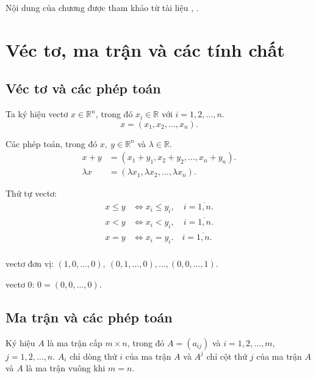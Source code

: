 \documentclass[12pt,a4paper]{report}
\begin{document}
Nội dung của chương được tham khảo từ tài liệu \cite{phanhoangchon}, \cite{lay2003linear}.

\section{ Véc tơ, ma trận và các tính chất}

\subsection{ Véc tơ và các phép toán }

Ta ký hiệu vectơ $x \in \mathbb{R}^n$, trong đó $x_i \in \mathbb{R}$ với $i=1,2,\ldots,n$.
\begin{equation*}
x=(x_1,x_2,\ldots,x_n).
\end{equation*}
 
Các phép toán, trong đó $x, \: y \in \mathbb{R}^n$ và $\lambda \in \mathbb{R}$.
\begin{equation*}
\begin{split}
x + y &= (x_1 + y_1, x_2 + y_2 , \ldots , x_n +y_n). \\
\lambda x &= (\lambda x_1 , \lambda x_2 , \ldots , \lambda x_n).
\end{split}
\end{equation*}

Thứ tự vectơ:
\begin{equation*}
\begin{split}
x \leq y & \Leftrightarrow x_i \leq y_i, \quad i= \overline{1,n}. \\
x < y & \Leftrightarrow x_i < y_i,  \quad i= \overline{1,n}.\\
x = y & \Leftrightarrow x_i = y_i. \quad i= \overline{1,n}. \\
\end{split}
\end{equation*}

 vectơ đơn vị: $(1,0,\ldots,0),\:(0,1,\ldots,0) , \ldots , (0,0,\ldots,1)$.

 vectơ $0$: $0=(0,0,\ldots,0)$. 

\subsection{ Ma trận và các phép toán}
 Ký hiệu $A$ là ma trận cấp $m\times n$, trong đó $A=(a_{ij})$ và $i=1,2,\ldots,m$, $j=1,2,\ldots,n$. $A_i$ chỉ dòng thứ $i$ của ma trận $A$ và $A^j$ chỉ cột thứ $j$ của ma trận $A$ và $A$ là ma trận vuông khi $m=n$.
\end{document}
